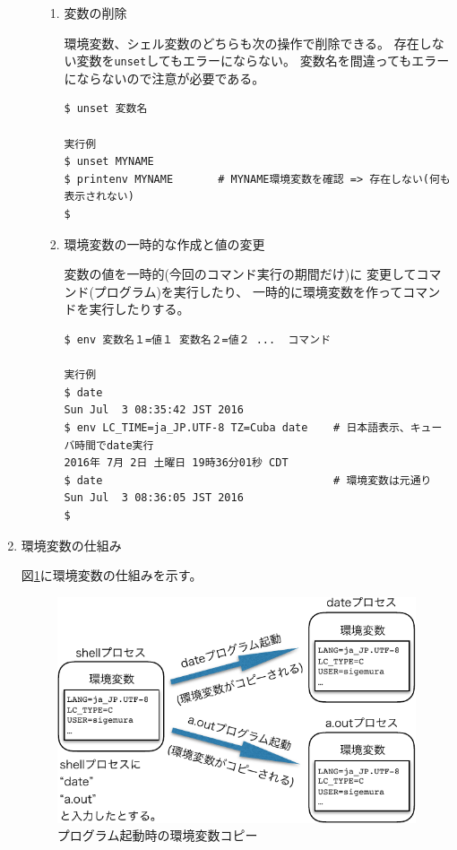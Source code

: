 \documentclass[a4j,dvipdfmx]{jarticle}
\begin{document}
\begin{enumerate}
\begin{enumerate}
\begin{enumerate}
\item 変数の削除

環境変数、シェル変数のどちらも次の操作で削除できる。
存在しない変数を\verb/unset/してもエラーにならない。
変数名を間違ってもエラーにならないので注意が必要である。

\begin{lstlisting}[numbers=none]
$ unset 変数名

実行例
$ unset MYNAME
$ printenv MYNAME       # MYNAME環境変数を確認 => 存在しない(何も表示されない)
$
\end{lstlisting}

\item 環境変数の一時的な作成と値の変更

変数の値を一時的(今回のコマンド実行の期間だけ)に
変更してコマンド(プログラム)を実行したり、
一時的に環境変数を作ってコマンドを実行したりする。

\begin{lstlisting}[numbers=none]
$ env 変数名１=値１ 変数名２=値２ ...  コマンド

実行例
$ date
Sun Jul  3 08:35:42 JST 2016
$ env LC_TIME=ja_JP.UTF-8 TZ=Cuba date    # 日本語表示、キューバ時間でdate実行
2016年 7月 2日 土曜日 19時36分01秒 CDT
$ date                                    # 環境変数は元通り
Sun Jul  3 08:36:05 JST 2016
$
\end{lstlisting}

\end{enumerate}

\end{enumerate}

\item 環境変数の仕組み

図\ref{fig1}に環境変数の仕組みを示す。

\begin{figure}[hbtp]
  \begin{center} %
    \includegraphics[scale=0.8]{fig1-crop.pdf}
    \caption{プログラム起動時の環境変数コピー}
    \label{fig1}
  \end{center}
\end{figure}


\end{enumerate}
\end{document}
